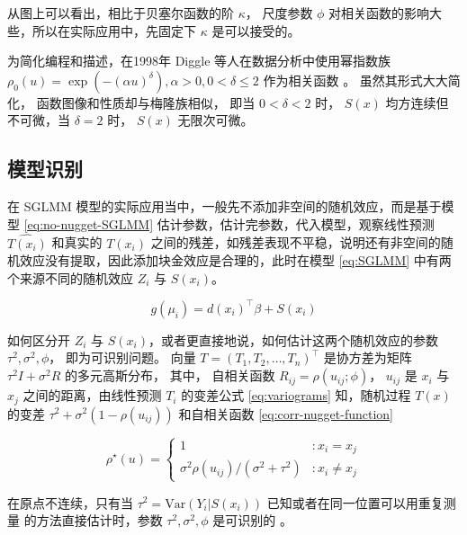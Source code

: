 \documentclass[12pt,a4paper,UTF8,twoside]{book}
\theoremstyle{definition}
\theoremstyle{definition}
\theoremstyle{definition}
\theoremstyle{remark}
\begin{document}
从图上可以看出，相比于贝塞尔函数的阶 \(\kappa\)， 尺度参数 \(\phi\)
对相关函数的影响大些，所以在实际应用中，先固定下 \(\kappa\)
是可以接受的。

为简化编程和描述，在1998年 Diggle 等人在数据分析中使用幂指数族
\(\rho_{0}(u) = \exp(-(\alpha u)^{\delta}), \alpha > 0, 0 < \delta \leq 2\)
作为相关函数 \citep{Diggle1998}。 虽然其形式大大简化，
函数图像和性质却与梅隆族相似， 即当 \(0 < \delta < 2\) 时， \(S(x)\)
均方连续但不可微，当 \(\delta = 2\) 时， \(S(x)\) 无限次可微。

\hypertarget{identify}{%
\subsection{模型识别}\label{identify}}

在 SGLMM 模型的实际应用当中，一般先不添加非空间的随机效应，而是基于模型
\eqref{eq:no-nugget-SGLMM} 估计参数，估计完参数，代入模型，观察线性预测
\(\hat{T(x_{i})}\) 和真实的 \(T(x_i)\)
之间的残差，如残差表现不平稳，说明还有非空间的随机效应没有提取，因此添加块金效应是合理的，此时在模型
\eqref{eq:SGLMM} 中有两个来源不同的随机效应 \(Z_{i}\) 与 \(S(x_i)\)。

\begin{equation}
g(\mu_i) = d(x_i)^{\top}\beta + S(x_i) \label{eq:no-nugget-SGLMM}
\end{equation}

如何区分开 \(Z_{i}\) 与
\(S(x_i)\)，或者更直接地说，如何估计这两个随机效应的参数
\(\tau^2, \sigma^2, \phi\)， 即为可识别问题。 向量
\(T = (T_1,T_2,\ldots,T_n)^{\top}\) 是协方差为矩阵
\(\tau^2I + \sigma^2R\) 的多元高斯分布， 其中， 自相关函数
\(R_{ij} = \rho(u_{ij}; \phi)\)， \(u_{ij}\) 是 \(x_i\) 与 \(x_j\)
之间的距离，由线性预测 \(T_{i}\) 的变差公式 \eqref{eq:variograms}
知，随机过程 \(T(x)\) 的变差 \(\tau^2 + \sigma^2(1-\rho(u_{ij}))\)
和自相关函数 \eqref{eq:corr-nugget-function}

\begin{equation}
\rho^{\star}(u) =
\begin{cases}
                                     1 & : x_{i} = x_{j}  \\
\sigma^2\rho(u_{ij})/(\sigma^2+\tau^2) & : x_{i} \neq x_{j}
\end{cases} \label{eq:corr-nugget-function}
\end{equation}

\noindent 在原点不连续，只有当 \(\tau^2 = \mathrm{Var}(Y_i|S(x_i))\)
已知或者在同一位置可以用重复测量 的方法直接估计时，参数
\(\tau^2, \sigma^2, \phi\) 是可识别的
\citep{Diggle2002Childhood, Diggle2007}。
\end{document}
